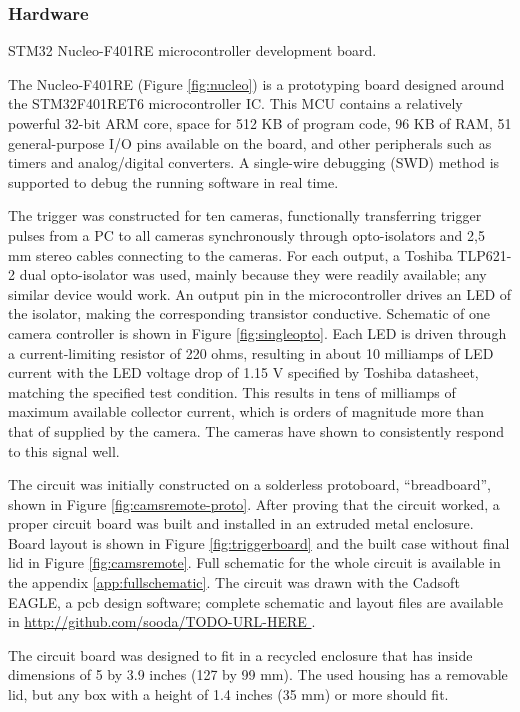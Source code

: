 \subsubsection{Hardware}

{STM32 Nucleo-F401RE microcontroller development board.}

The Nucleo-F401RE (Figure \ref{fig:nucleo}) is a prototyping board designed around the STM32F401RET6 microcontroller IC.
This MCU contains a relatively powerful 32-bit ARM core, space for 512 KB of program code, 96 KB of RAM, 51 general-purpose I/O pins available on the board, and other peripherals such as timers and analog/digital converters.
A single-wire debugging (SWD) method is supported to debug the running software in real time.

The trigger was constructed for ten cameras, functionally transferring trigger pulses from a PC to all cameras synchronously through opto-isolators and 2,5 mm stereo cables connecting to the cameras.
For each output, a Toshiba TLP621-2 dual opto-isolator was used, mainly because they were readily available; any similar device would work.
An output pin in the microcontroller drives an LED of the isolator, making the corresponding transistor conductive.
Schematic of one camera controller is shown in Figure \ref{fig:singleopto}.
Each LED is driven through a current-limiting resistor of 220 ohms, resulting in about 10 milliamps of LED current with the LED voltage drop of 1.15 V specified by Toshiba datasheet, matching the specified test condition.
This results in tens of milliamps of maximum available collector current, which is orders of magnitude more than that of supplied by the camera. %
The cameras have shown to consistently respond to this signal well.

The circuit was initially constructed on a solderless protoboard, ``breadboard'', shown in Figure \ref{fig:camsremote-proto}.
After proving that the circuit worked, a proper circuit board was built and installed in an extruded metal enclosure.
Board layout is shown in Figure \ref{fig:triggerboard} and the built case without final lid in Figure \ref{fig:camsremote}.
Full schematic for the whole circuit is available in the appendix \ref{app:fullschematic}.
The circuit was drawn with the Cadsoft EAGLE, a pcb design software; complete schematic and layout files are available in \url { http://github.com/sooda/TODO-URL-HERE }.

The circuit board was designed to fit in a recycled enclosure that has inside dimensions of 5 by 3.9 inches (127 by 99 mm).
The used housing has a removable lid, but any box with a height of 1.4 inches (35 mm) or more should fit.


